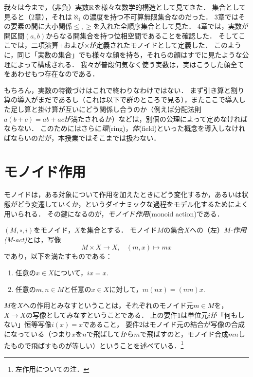 \documentclass[11pt,a4paper,uplatex]{jsarticle}
\begin{document}
\begin{develop}
我々は今まで，（非負）実数$\mathbb{R}$を様々な数学的構造として見てきた．
集合として見ると（2章），それは$\aleph_1$の濃度を持つ不可算無限集合なのだった．
3章ではその要素の間に大小関係$\leq, \geq$を入れた全順序集合として見た．
4章では，実数が開区間$(a,b)$からなる開集合を持つ位相空間であることを確認した．
そしてここでは，二項演算$+$および$\times$が定義されたモノイドとして定義した．
このように，同じ「実数の集合」でも様々な顔を持ち，それらの顔はすでに見たような公理によって構成される．
我々が普段何気なく使う実数は，実はこうした顔全てをあわせもつ存在なのである．

 もちろん，実数の特徴づけはこれで終わりなわけではない．
 まず引き算と割り算の導入がまだであるし（これは以下で群のところで見る），またここで導入した足し算と掛け算が互いにどう関係し合うのか（例えば分配法則$a(b+c) = ab + ac$が満たされるか）などは，別個の公理によって定めなければならない．
 このためにはさらに\emph{環}(ring)，\emph{体}(field)といった概念を導入しなければならいのだが，本授業ではそこまでは扱わない．
\end{develop}


\section{モノイド作用}
モノイドは，ある対象について作用を加えたときにどう変化するか，あるいは状態がどう変遷していくか，というダイナミックな過程をモデル化するためによく用いられる．
その鍵になるのが，\emph{モノイド作用}(monoid action)である．

\begin{dfn}
 $(M, \circ, i)$をモノイド，$X$を集合とする．
 モノイド$M$の集合$X$への（左）\emph{$M$-作用(M-act)}とは，写像
 \[
  M \times X \to X, \ \ \ \ (m, x) \mapsto mx
 \]
 であり，以下を満たすものである：
 \begin{enumerate}
  \item 任意の$x \in X$について，$ix = x$.
  \item 任意の$m, n \in M$と任意の$x \in X$に対して，$m(nx) = (mn)x$.
 \end{enumerate}
\end{dfn}
$M$を$X$への作用とみなすということは，それぞれのモノイド元$m \in M$を，$X \to X$の写像としてみなすということである．
上の要件1は単位元$i$が「何もしない」恒等写像$i(x)=x$であること，
要件2はモノイド元の結合が写像の合成になっている（つまり$x$を$n$で飛ばしてから$m$で飛ばすのと，モノイド合成$mn$したもので飛ばすものが等しい）ということを述べている．\footnote{左作用についての注．}
\end{document}
